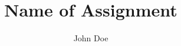 \documentclass[a4paper,11pt]{article}
\begin{document}
\title{Name of Assignment}
\author{John Doe}
\def\studyno{12345678}
\def\handindate{01/01/1970}

\maketitle




\end{document}
